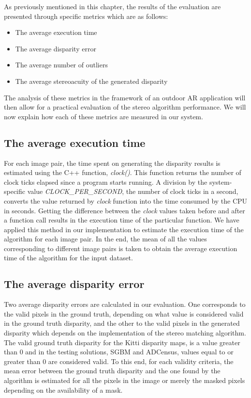 As previously mentioned in this chapter, the results of the evaluation are presented through specific metrics which are as follows:

\begin{itemize}
\item{The average execution time}
\item{The average disparity error}
\item{The average number of outliers}
\item{The average stereoacuity of the generated disparity}
\end{itemize}

The analysis of these metrics in the framework of an outdoor AR application will then allow for a practical evaluation of the stereo algorithm performance.
We will now explain how each of these metrics are measured in our system.

\subsection{The average execution time}
For each image pair, the time spent on generating the disparity results is estimated using the C++ function, \textit{clock()}. 
This function returns the number of clock ticks elapsed
since a program starts running. A division by the system-specific value \textit{CLOCK\_PER\_SECOND}, the number of clock ticks in a second, 
converts the value returned by \textit{clock} function into the time consumed by the CPU in seconds.
Getting the difference between the \textit{clock} values taken before and after a function call results in the execution time
of the particular function. 
We have applied this method in our implementation to estimate the execution time of the algorithm for each image pair. In the end, the mean of all
the values corresponding to different image pairs is taken to obtain the average execution time of the algorithm for the input dataset.

\subsection{The average disparity error}
Two average disparity errors are calculated in our evaluation. One corresponds to the valid pixels in the ground truth, depending on what value is considered valid
in the ground truth disparity, and the other to
the valid pixels in the generated disparity which depends on the implementation of the stereo matching algorithm.
The valid ground truth disparity for the Kitti disparity maps, is a value greater than 0 and in the testing solutions, SGBM and ADCensus, 
values equal to or greater than 0 are considered valid.
To this end, for each validity criteria, the mean error between the ground truth disparity and the one found by the algorithm
is estimated for all the pixels in the image or merely the masked pixels depending on the availability of a mask.  

